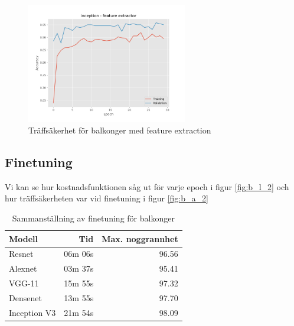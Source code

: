 \documentclass[]{kththesis}
\begin{document}
\begin{figure}[h]
  \includegraphics[width=7cm]{b_a_inception_fe}
  \caption{Träffsäkerhet för balkonger med feature extraction}
  \label{fig:b_a_1}
\end{figure}

\subsection{Finetuning}
Vi kan se hur kostnadsfunktionen såg ut för varje epoch i figur \ref{fig:b_l_2} och hur träffsäkerheten var vid finetuning i figur \ref{fig:b_a_2}

\begin{table}
  \centering
  \begin{tabular}{|l|r|r|}
    Modell & Tid & Max. noggrannhet \\ 
    \hline
    Resnet       & 06m 06s & 96.56 \\
    Alexnet      & 03m 37s & 95.41 \\
    VGG-11       & 15m 55s & 97.32 \\
    Densenet     & 13m 55s & 97.70 \\
    Inception V3 & 21m 54s & 98.09 \\
  \end{tabular}
  \caption{Sammanställning av finetuning för balkonger}
\end{table}
\end{document}
